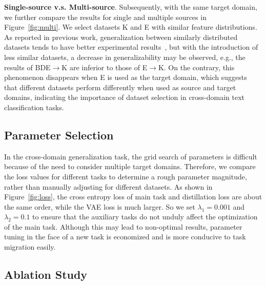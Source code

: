 \documentclass[letterpaper]{article} %
\begin{document}
\textbf{Single-source v.s. Multi-source}. Subsequently, with the same target domain, we further compare the results for single and multiple sources in Figure~\ref{fig:multi}. We select datasets K and E with similar feature distributions. As reported in previous work, generalization between similarly distributed datasets tends to have better experimental results~\cite{WuS22}, but with the introduction of less similar datasets, a decrease in generalizability may be observed, e.g., the results of BDE$\to$K are inferior to those of E$\to$K. On the contrary, this phenomenon disappears when E is used as the target domain, which suggests that different datasets perform differently when used as source and target domains, indicating the importance of dataset selection in cross-domain text classification tasks.


\subsection{Parameter Selection}\label{sec:params}

In the cross-domain generalization task, the grid search of parameters is difficult because of the need to consider multiple target domains. Therefore, we compare the loss values for different tasks to determine a rough parameter magnitude, rather than manually adjusting for different datasets. As shown in Figure~\ref{fig:loss}, the cross entropy loss of main task and distillation loss are about the same order, while the VAE loss is much larger. So we set $\lambda_1=0.001$ and $\lambda_2=0.1$ to ensure that the auxiliary tasks do not unduly affect the optimization of the main task. Although this may lead to non-optimal results, parameter tuning in the face of a new task is economized and is more conducive to task migration easily.


\subsection{Ablation Study}\label{sec:abl}
\end{document}
